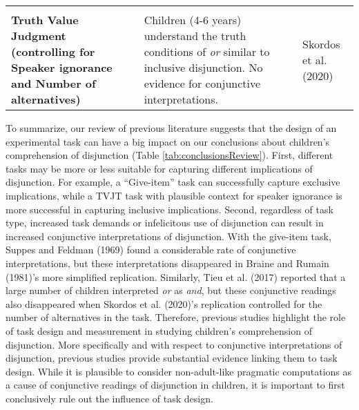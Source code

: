 \documentclass[
  english,
  ,man,floatsintext]{apa6}
\begin{document}
\begin{longtable}[]{@{}lll@{}}
\begin{minipage}[t]{0.17\columnwidth}
\end{minipage}\tabularnewline
\begin{minipage}[t]{0.35\columnwidth}\raggedright
\textbf{Truth Value Judgment (controlling for Speaker ignorance and Number of alternatives)}\strut
\end{minipage} & \begin{minipage}[t]{0.40\columnwidth}\raggedright
Children (4-6 years) understand the truth conditions of \emph{or} similar to inclusive disjunction. No evidence for conjunctive interpretations.\strut
\end{minipage} & \begin{minipage}[t]{0.17\columnwidth}\raggedright
Skordos et al. (2020)\strut
\end{minipage}\tabularnewline
\bottomrule
\end{longtable}

To summarize, our review of previous literature suggests that the design of an experimental task can have a big impact on our conclusions about children's comprehension of disjunction (Table \ref{tab:conclusionsReview}). First, different tasks may be more or less suitable for capturing different implications of disjunction. For example, a \enquote{Give-item} task can successfully capture exclusive implications, while a TVJT task with plausible context for speaker ignorance is more successful in capturing inclusive implications. Second, regardless of task type, increased task demands or infelicitous use of disjunction can result in increased conjunctive interpretations of disjunction. With the give-item task, Suppes and Feldman (1969) found a considerable rate of conjunctive interpretations, but these interpretations disappeared in Braine and Rumain (1981)'s more simplified replication. Similarly, Tieu et al. (2017) reported that a large number of children interpreted \emph{or} as \emph{and}, but these conjunctive readings also disappeared when Skordos et al. (2020)'s replication controlled for the number of alternatives in the task. Therefore, previous studies highlight the role of task design and measurement in studying children's comprehension of disjunction. More specifically and with respect to conjunctive interpretations of disjunction, previous studies provide substantial evidence linking them to task design. While it is plausible to consider non-adult-like pragmatic computations as a cause of conjunctive readings of disjunction in children, it is important to first conclusively rule out the influence of task design.
\end{document}

